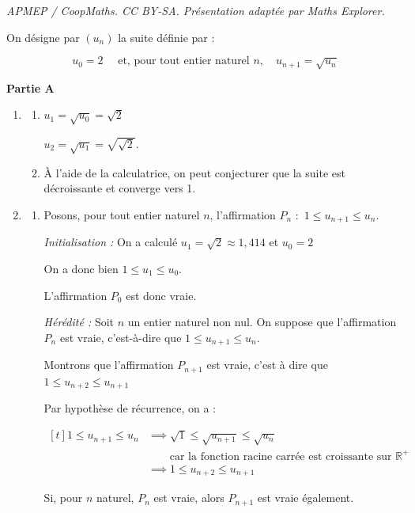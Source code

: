 \documentclass[10pt]{article}
\providecommand{\R}{\mathbb{R}}
\begin{document}
\noindent\textit{APMEP / CoopMaths. CC BY-SA. Présentation adaptée par Maths Explorer.}\par\medskip
On désigne par $\left(u_{n}\right)$ la suite définie par :

\[u_{0}=2 \quad \text { et, pour tout entier naturel } n,\quad  u_{n+1}=\sqrt{u_{n}}\]

\medskip

\textbf{Partie A}

\medskip

\begin{enumerate}
\item
	\begin{enumerate}
		\item 

$u_1=\sqrt{u_0}=\sqrt{2}$

$u_2=\sqrt{u_1} =\sqrt{\sqrt{2}}$.
		\item À l'aide de la calculatrice, on peut conjecturer que la suite est décroissante et converge vers 1.
	\end{enumerate}
\item
	\begin{enumerate}
		\item Posons, pour tout entier naturel $n$, l'affirmation $P_n$ :~\og $1 \leqslant u_{n+1} \leqslant u_{n}$\fg{}.\hfill

\emph{Initialisation :} On a calculé $u_1 = \sqrt{2} \approx 1,414$ et $u_0=2$

On a donc bien $1 \leqslant u_1 \leqslant u_0$.

L'affirmation $P_0$ est donc vraie.

\emph{Hérédité :} Soit $n$ un entier naturel non nul. On suppose que l'affirmation $P_n$ est vraie, c'est-à-dire que $1 \leqslant u_{n+1} \leqslant u_{n}$.

Montrons que l'affirmation $P_{n+1}$ est vraie, c'est à dire que $1 \leqslant u_{n+2} \leqslant u_{n+1}$

Par hypothèse de récurrence, on a :

$ \begin{aligned}[t]
1 \leqslant u_{n+1} \leqslant u_n
	&\implies \sqrt{1} \leqslant \sqrt{u_{n+1}} \leqslant \sqrt{u_n}\\
	&\qquad \text{car  la fonction racine carrée est croissante sur } \R^+ \\
	&\implies 1 \leqslant u_{n+2} \leqslant u_{n+1}
\end{aligned}$

Si, pour $n$ naturel, $P_n$ est vraie, alors $P_{n+1}$ est vraie également.


\end{enumerate}
\end{enumerate}
\end{document}
